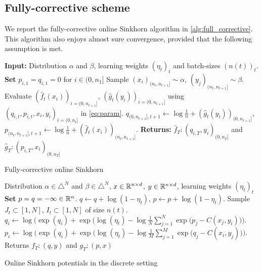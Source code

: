\subsection{Fully-corrective scheme}\label{app:fully_corrective}

We report the fully-corrective online Sinkhorn algorithm in \autoref{alg:full_corrective}. This algorithm also enjoys almost sure convergence, provided that the following assumption is met.

\begin{algorithm}[t]
    \begin{algorithmic}
    \State \textbf{Input:} Distribution $\alpha$ and $\beta$, learning weights ${(\eta_t)}_t$ and batch-sizes ${(n(t))}_t$. 
    \textbf{Set} $p_{i,1} = q_{i,1} = 0$ for $i \in (0, n_1]$
        \State Sample $(x_i)_{(n_t, n_{t+1}]} \sim \alpha$, $(y_j)_{(n_t, n_{t+1}]} \sim \beta$.
            \State Evaluate $(\hat f_t(x_i))_{i=(0, n_{t+1}]}$,
             $(\hat g_t(y_i))_{i=(0, n_{t+1}]}$ using $(q_{i,t}, p_{i,t}, x_i, y_i)_{i=(0,n_{t}]}$ in \eqref{eq:param}.
             \State $q_{(0, n_{t+1}],t+1} {\gets} \log \frac{1}{n}
             + (\hat g_t(y_i))_{(0, n_{t+1}]}$,
             \qquad $p_{(n_t, n_{t+1}],t+1} {\gets} \log \frac{1}{n} 
             + (\hat f_t(x_i))_{(n_t, n_{t+1}]}$.
    \EndFor
    \State \textbf{Returns:} $\hat f_T : (q_{i,T}, y_i)_{(0, n_T]}$ and
    $\hat g_T : (p_{i,T}, x_i)_{(0, n_T]}$
    \end{algorithmic}
    \vspace{-.4em}
    \caption{Fully-corrective online Sinkhorn}\label{alg:full_corrective}
\end{algorithm}

\begin{algorithm}[t]
    \begin{algorithmic}
    \Input Distribution $\alpha \in \triangle^N$ and 
    $\beta \in \triangle^N$, $x \in \mathbb{R}^{n \times d}$, 
    $y \in \mathbb{R}^{n \times d}$, learning weights ${(\eta_t)}_t$
    \State \textbf{Set} $p = q = - \infty \in \mathbb{R}^n$.
        \State $q \gets q + \log(1 - \eta_t)$, $p \gets p + \log(1 - \eta_t)$.
        \State Sample $J_t \subset [1, N]$, $I_t \subset [1, N]$ of size $n(t)$.
            \State $q_i \gets \log \Big( \exp(q_i)
            + \exp\big(\log(\eta_t) - \log \frac{1}{N} 
            \sum_{j=1}^{N} \exp(p_j - C(x_j, y_i)\big) \Big) $.
        \EndFor
        \State $p_i \gets \log \Big( \exp(q_i)
        + \exp \big( \log(\eta_t) - \log \frac{1}{M} 
        \sum_{j=1}^{M} \exp(q_j - C(x_i, y_j)\big) \Big)$.
        \EndFor
    \EndFor
    \State Returns $f_T : (q, y)$ and
    $g_T : (p, x)$
    \end{algorithmic}
    \caption{Online Sinkhorn potentials in the discrete setting}\label{alg:discrete_online}
\end{algorithm}

